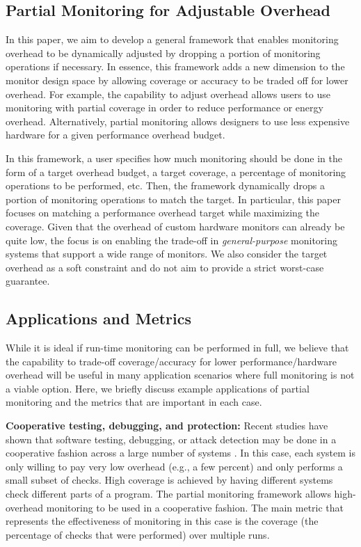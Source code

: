\subsection{Partial Monitoring for Adjustable Overhead}

In this paper, we aim to develop a general framework that enables monitoring
overhead to be dynamically adjusted by dropping a portion of monitoring
operations if necessary. In essence, this framework adds a new dimension to the
monitor design space by allowing coverage or accuracy to be traded off for
lower overhead. For example, the capability to adjust overhead allows users to
use monitoring with partial coverage in order to reduce performance or energy
overhead. Alternatively, partial monitoring allows designers to use less
expensive hardware for a given performance overhead budget.

In this framework, a user specifies how much monitoring should be done in the
form of a target overhead budget, a target coverage, a percentage of monitoring
operations to be performed, etc.  Then, the framework dynamically drops a
portion of monitoring operations to match the target. In particular, this paper
focuses on matching a performance overhead target while maximizing the
coverage. Given that the overhead of custom hardware monitors can already be
quite low, the focus is on enabling the trade-off in {\em general-purpose}
monitoring systems that support a wide range of monitors.  We also consider the
target overhead as a soft constraint and do not aim to provide a strict
worst-case guarantee.

\subsection{Applications and Metrics}

While it is ideal if run-time monitoring can be performed in full, we believe
that the capability to trade-off coverage/accuracy for lower
performance/hardware overhead will be useful in many application scenarios
where full monitoring is not a viable option.  Here, we briefly discuss example
applications of partial monitoring and the metrics that are important in each
case.

{\bf Cooperative testing, debugging, and protection:} 
Recent studies have shown that software testing, debugging, or attack detection
may be done in a cooperative fashion across a large number of systems
\cite{liblit-pldi05, chilimbi-asplos04, greathouse-cgo11, testudo-micro08}. In
this case, each system is only willing to pay very low overhead (e.g., a few
percent) and only performs a small subset of checks.  High coverage is achieved
by having different systems check different parts of a program.  The partial
monitoring framework allows high-overhead monitoring to be used in a
cooperative fashion.  The main metric that represents the effectiveness of
monitoring in this case is the coverage (the percentage of checks that were
performed) over multiple runs.

